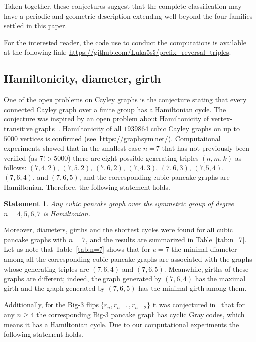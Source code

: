 \documentclass[
final
]{dmtcs-episciences}
\newtheorem{statement}{Statement}
\begin{document}
\vspace{5mm}

Taken together, these conjectures suggest that the complete classification may have a periodic and geometric description extending
well beyond the four families settled in this paper.

For the interested reader, the code use to conduct the computations is available at the following link: \url{https://github.com/Luka5s5/prefix_reversal_triples}.

\subsection{Hamiltonicity, diameter, girth}\label{sec:graph}

One of the open problems on Cayley graphs is the conjecture stating that every connected Cayley graph over a finite group has a Hamiltonian cycle. The conjecture was inspired by an open problem about Hamiltonicity of vertex-transitive graphs~\cite{L70}. Hamiltonicity of all $1939864$ cubic Cayley graphs on up to $5000$ vertices is confirmed (see~\url{https://graphsym.net/}).  Computational experiments showed that in the smallest case $n=7$ that has not previously been verified (as $7!>5000$) there are eight possible generating triples $(n,m,k)$ as follows: $(7,4,2)$, $(7,5,2)$, $(7,6,2)$, $(7,4,3)$, $(7,6,3)$, $(7,5,4)$, $(7,6,4)$, and $(7,6,5)$, and the corresponding cubic pancake graphs are Hamiltonian. Therefore, the following statement holds. 

\begin{statement}
Any cubic pancake graph over the symmetric group of degree $n=4,5,6,7$ is Hamiltonian.  
\end{statement}

Moreover, diameters, girths and the shortest cycles were found for all cubic pancake graphs with $n=7$, and the results are summarized in Table~\ref{tab:n=7}. Let us note that Table~\ref{tab:n=7} shows that for $n=7$ the minimal diameter among all the corresponding cubic pancake graphs are associated with the graphs whose generating triples are $(7,6,4)$ and $(7,6,5)$. Meanwhile, girths of these graphs are different; indeed, the graph generated by $(7,6,4)$ has the maximal girth and the graph generated by $(7,6,5)$ has the minimal girth among them.


Additionally, for the Big-3 flips $\{r_n,r_{n-1},r_{n-2}\}$ it was conjectured in~\cite{SW16} that for any $n\geqslant 4$ the corresponding Big-3 pancake graph has cyclic Gray codes, which means it has a Hamiltonian cycle. Due to our computational experiments the following statement holds.
\end{document}
